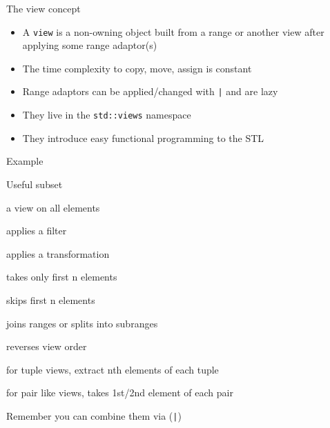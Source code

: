 \begin{frame}[fragile]
  \begin{block}{The view concept}
    \begin{itemize}
    \item A \texttt{view} is a non-owning object built from a range or another view after applying some range adaptor(s)
    \item The time complexity to copy, move, assign is constant
    \item Range adaptors can be applied/changed with \texttt{|} and are lazy
    \item They live in the \texttt{std::views} namespace
    \item They introduce easy functional programming to the STL
    \end{itemize}
  \end{block}
  \begin{exampleblock}{Example}
    { \scriptsize
    }
  \end{exampleblock}  
\end{frame}

\begin{frame}[fragile]
  \begin{block}{Useful subset}
    \begin{description}
    \item[all] a view on all elements
    \item[filter] applies a filter
    \item[transform] applies a transformation
    \item[take] takes only first n elements
    \item[drop] skips first n elements
    \item[join/split] joins ranges or splits into subranges
    \item[reverse] reverses view order
    \item[elements] for tuple views, extract nth elements of each tuple
    \item[keys/values] for pair like views, takes 1st/2nd element of each pair
    \end{description}
  \end{block}
  Remember you can combine them via (\texttt{|})
\end{frame}

